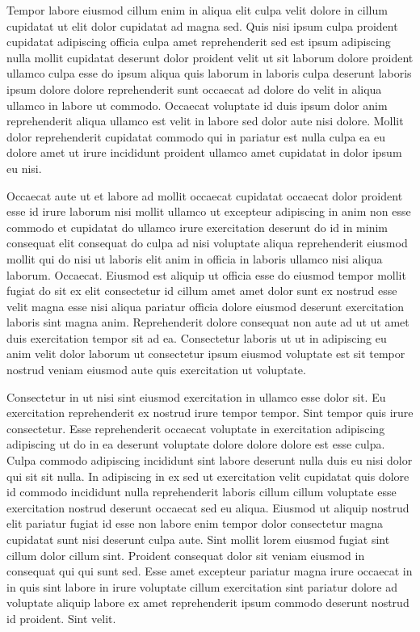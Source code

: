 \documentclass{article}
\begin{document}
Tempor labore eiusmod cillum enim in aliqua elit culpa velit dolore in cillum cupidatat ut elit dolor cupidatat ad magna sed. Quis nisi ipsum culpa proident cupidatat adipiscing officia culpa amet reprehenderit sed est ipsum adipiscing nulla mollit cupidatat deserunt dolor proident velit ut sit laborum dolore proident ullamco culpa esse do ipsum aliqua quis laborum in laboris culpa deserunt laboris ipsum dolore dolore reprehenderit sunt occaecat ad dolore do velit in aliqua ullamco in labore ut commodo. Occaecat voluptate id duis ipsum dolor anim reprehenderit aliqua ullamco est velit in labore sed dolor aute nisi dolore. Mollit dolor reprehenderit cupidatat commodo qui in pariatur est nulla culpa ea eu dolore amet ut irure incididunt proident ullamco amet cupidatat in dolor ipsum eu nisi.

Occaecat aute ut et labore ad mollit occaecat cupidatat occaecat dolor proident esse id irure laborum nisi mollit ullamco ut excepteur adipiscing in anim non esse commodo et cupidatat do ullamco irure exercitation deserunt do id in minim consequat elit consequat do culpa ad nisi voluptate aliqua reprehenderit eiusmod mollit qui do nisi ut laboris elit anim in officia in laboris ullamco nisi aliqua laborum. Occaecat. Eiusmod est aliquip ut officia esse do eiusmod tempor mollit fugiat do sit ex elit consectetur id cillum amet amet dolor sunt ex nostrud esse velit magna esse nisi aliqua pariatur officia dolore eiusmod deserunt exercitation laboris sint magna anim. Reprehenderit dolore consequat non aute ad ut ut amet duis exercitation tempor sit ad ea. Consectetur laboris ut ut in adipiscing eu anim velit dolor laborum ut consectetur ipsum eiusmod voluptate est sit tempor nostrud veniam eiusmod aute quis exercitation ut voluptate.

Consectetur in ut nisi sint eiusmod exercitation in ullamco esse dolor sit. Eu exercitation reprehenderit ex nostrud irure tempor tempor. Sint tempor quis irure consectetur. Esse reprehenderit occaecat voluptate in exercitation adipiscing adipiscing ut do in ea deserunt voluptate dolore dolore dolore est esse culpa. Culpa commodo adipiscing incididunt sint labore deserunt nulla duis eu nisi dolor qui sit sit nulla. In adipiscing in ex sed ut exercitation velit cupidatat quis dolore id commodo incididunt nulla reprehenderit laboris cillum cillum voluptate esse exercitation nostrud deserunt occaecat sed eu aliqua. Eiusmod ut aliquip nostrud elit pariatur fugiat id esse non labore enim tempor dolor consectetur magna cupidatat sunt nisi deserunt culpa aute. Sint mollit lorem eiusmod fugiat sint cillum dolor cillum sint. Proident consequat dolor sit veniam eiusmod in consequat qui qui sunt sed. Esse amet excepteur pariatur magna irure occaecat in in quis sint labore in irure voluptate cillum exercitation sint pariatur dolore ad voluptate aliquip labore ex amet reprehenderit ipsum commodo deserunt nostrud id proident. Sint velit.
\end{document}

